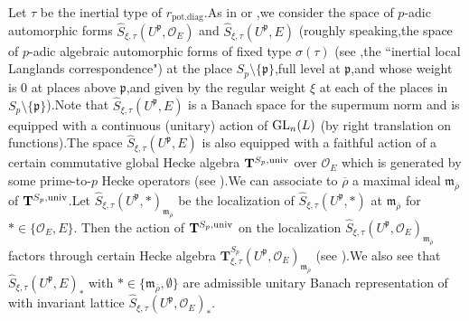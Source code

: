 \documentclass[SecEq,CM,GP]{degruyter-crelle} %
\theoremstyle{plain}
\newcommand{\GLN}{{\rm GL}}
\newcommand{\univ}{{\rm univ}}
\newcommand{\bT}{{\mathbf{T}}}
\newcommand{\co}{\mathcal O}
\newcommand{\cO}{\mathcal O}
\newcommand{\fm}{{\mathfrak{m}}}
\newcommand{\fp}{{\mathfrak{p}}}
\begin{document}
Let $\tau$ be the inertial type of $r_{\mathrm{pot.diag}}$.\;As in \cite[Section 4.1.1,\;Page 8029]{2019DINGSimple} or  \cite[Section 2,\;Page 215]{PATCHING2016},\;we consider the space of $p$-adic automorphic forms 	$\widehat{S}_{\xi,\tau}(U^{\fp}, \co_E)$ and $\widehat{S}_{\xi,\tau}(U^{\fp},E)$ (roughly speaking,\;the space of $p$-adic algebraic automorphic forms of fixed type $\sigma(\tau)$ (see \cite[Theorem 3.7]{PATCHING2016},\;the ``inertial local Langlands correspondence") at the place $S_p\setminus\{\fp\}$,\;full level at $\fp$,\;and whose weight is $0$ at places above $\fp$,\;and given by the regular weight $\xi$ at each of the places in $S_p\setminus\{\fp\}$).\;Note that $\widehat{S}_{\xi,\tau}(U^{\fp},E)$ is a Banach space for the supermum norm and is equipped with a continuous (unitary) action of $\GLN_n(L)$ (by right translation on functions).\;The space $\widehat{S}_{\xi,\tau}(U^{\fp},E)$  is also equipped with a faithful  action of a certain commutative global Hecke algebra $\bT^{S_p,\univ}$ over $\cO_E$ which is generated by some prime-to-$p$ Hecke operators (see \cite[Section 4.1.1,\;Page 8029]{2019DINGSimple}).\;We can associate to $\overline{\rho}$ a maximal ideal $\fm_{\overline{\rho}}$ of $\bT^{S_p,\univ}$.\;Let $\widehat{S}_{\xi,\tau}(U^{\fp},\ast)_{\fm_{\overline{\rho}}}$ be the localization of $\widehat{S}_{\xi,\tau}(U^{\fp},\ast)$ at $\fm_{\overline{\rho}}$ for $\ast\in\{\co_E,E\}$.\;
Then the action of $\bT^{S_p,\univ}$ on the localization $\widehat{S}_{\xi,\tau}(U^{\fp}, \co_E)_{\fm_{\overline{\rho}}}$ factors through certain  Hecke algebra
$\bT_{\xi,\tau}^{S_p}(U^{\fp}, \co_E)_{\fm_{\overline{\rho}}}$ (see \cite[Page 8029]{2019DINGSimple}).\;We also see that $\widehat{S}_{\xi,\tau}(U^{\fp},E)_{*}$ with $*\in \{\fm_{\overline{\rho}}, \emptyset\}$ are admissible unitary Banach representation of with invariant lattice $\widehat{S}_{\xi,\tau}(U^{\fp}, \co_E)_*$.\;
\end{document}
